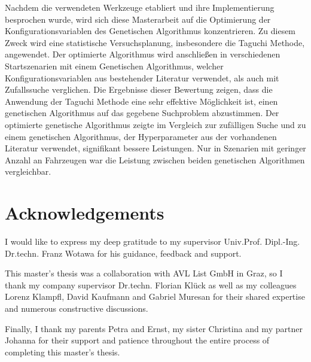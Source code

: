 Nachdem die verwendeten Werkzeuge etabliert und ihre Implementierung besprochen wurde, wird sich diese Masterarbeit auf die Optimierung der Konfigurationsvariablen des Genetischen Algorithmus konzentrieren. Zu diesem Zweck wird eine statistische Versuchsplanung, insbesondere die Taguchi Methode, angewendet. Der optimierte Algorithmus wird anschließen in verschiedenen Startszenarien mit einem Genetischen Algorithmus, welcher Konfigurationsvariablen aus bestehender Literatur verwendet, als auch mit Zufallssuche verglichen. Die Ergebnisse dieser Bewertung zeigen, dass die Anwendung der Taguchi Methode eine sehr effektive Möglichkeit ist, einen genetischen Algorithmus auf das gegebene Suchproblem abzustimmen. Der optimierte genetische Algorithmus zeigte im Vergleich zur zufälligen Suche und zu einem genetischen Algorithmus, der Hyperparameter aus der vorhandenen Literatur verwendet, signifikant bessere Leistungen. Nur in Szenarien mit geringer Anzahl an Fahrzeugen war die Leistung zwischen beiden genetischen Algorithmen vergleichbar.

\chapter*{Acknowledgements}
\label{chap:acknowledgements}
I would like to express my deep gratitude to my supervisor Univ.Prof. Dipl.-Ing. Dr.techn. Franz Wotawa for his guidance, feedback and support.

This master's thesis was a collaboration with AVL List GmbH in Graz, so I thank my company supervisor Dr.techn. Florian Klück as well as my colleagues Lorenz Klampfl, David Kaufmann and Gabriel Muresan for their shared expertise and numerous constructive discussions.

Finally, I thank my parents Petra and Ernst, my sister Christina and my partner Johanna for their support and patience throughout the entire process of completing this master's thesis.



